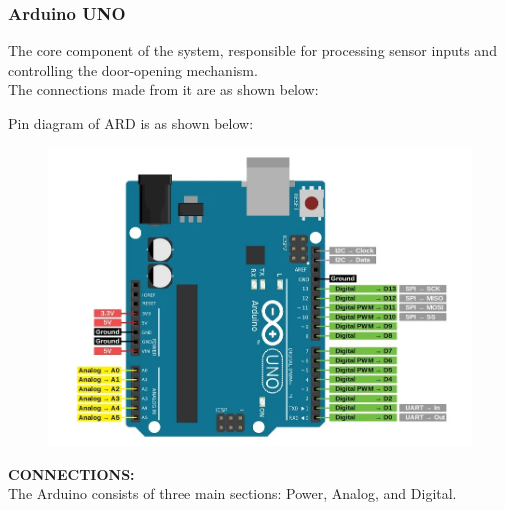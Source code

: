 \documentclass{article}
\begin{document}
\subsubsection{Arduino UNO}
The core component of the system, responsible for processing sensor inputs and controlling the door-opening mechanism. \\
The connections made from it are as shown below:

Pin diagram of ARD is as shown below:
\begin{figure}[H]
\centering
\includegraphics[scale = 0.3 ]{./figs/ardpindia.png}
\end{figure}
\textbf{CONNECTIONS:\\}
The Arduino consists of three main sections: Power, Analog, and Digital.
\end{document}
